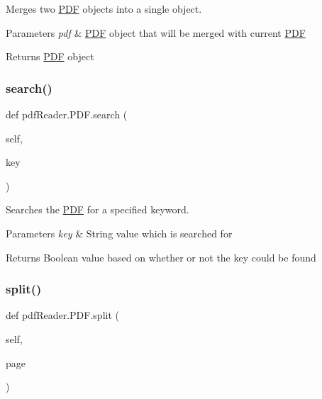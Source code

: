 Merges two \hyperlink{classpdfReader_1_1PDF}{P\+DF} objects into a single object. 


\begin{DoxyParams}{Parameters}
{\em pdf} & \hyperlink{classpdfReader_1_1PDF}{P\+DF} object that will be merged with current \hyperlink{classpdfReader_1_1PDF}{P\+DF} \\
\hline
\end{DoxyParams}
\begin{DoxyReturn}{Returns}
\hyperlink{classpdfReader_1_1PDF}{P\+DF} object 
\end{DoxyReturn}
\mbox{\label{classpdfReader_1_1PDF_adecd6d310fcbaf65067825dcb000c6e5}} 
\subsubsection{\texorpdfstring{search()}{search()}}
{\footnotesize\ttfamily def pdf\+Reader.\+P\+D\+F.\+search (\begin{DoxyParamCaption}\item[{}]{self,  }\item[{}]{key }\end{DoxyParamCaption})}



Searches the \hyperlink{classpdfReader_1_1PDF}{P\+DF} for a specified keyword. 


\begin{DoxyParams}{Parameters}
{\em key} & String value which is searched for \\
\hline
\end{DoxyParams}
\begin{DoxyReturn}{Returns}
Boolean value based on whether or not the key could be found 
\end{DoxyReturn}
\mbox{\label{classpdfReader_1_1PDF_ae0c66e62a60c32cf66340a7f63b37706}} 
\subsubsection{\texorpdfstring{split()}{split()}}
{\footnotesize\ttfamily def pdf\+Reader.\+P\+D\+F.\+split (\begin{DoxyParamCaption}\item[{}]{self,  }\item[{}]{page }\end{DoxyParamCaption})}




